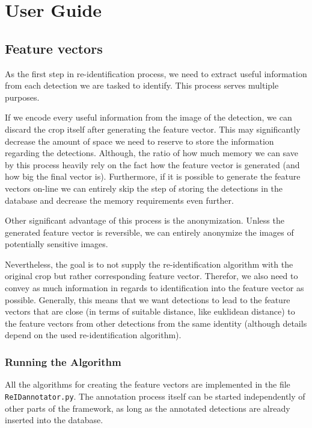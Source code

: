 \chapter{User Guide}

\label{ch:guide}

\section{Feature vectors}

As the first step in re-identification process, we need to extract useful information
from each detection we are tasked to identify. This process serves multiple purposes.

If we encode every useful information from the image of the detection, we can discard
the crop itself after generating the feature vector. This may significantly decrease
the amount of space we need to reserve to store the information regarding the detections.
Although, the ratio of how much memory we can save by this process heavily rely on
the fact how the feature vector is generated (and how big the final vector is).
Furthermore, if it is possible to generate the feature vectors on-line we can entirely
skip the step of storing the detections in the database and decrease the memory
requirements even further.

Other significant advantage of this process is the anonymization. Unless the generated
feature vector is reversible, we can entirely anonymize the images of potentially
sensitive images.

Nevertheless, the goal is to not supply the re-identification algorithm with the original
crop but rather corresponding feature vector. Therefor, we also need to convey
as much information in regards to identification into the feature vector as possible.
Generally, this means that we want detections to lead to the feature vectors that are
close (in terms of suitable distance, like euklidean distance) to the feature vectors
from other detections from the same identity (although details depend on the 
used re-identification algorithm).

\subsection{Running the Algorithm}
\label{sec:running_annotator}

All the algorithms for creating the feature vectors are implemented in the file
\texttt{ReID\/annotator.py}. The annotation process itself can be started independently
of other parts of the framework, as long as the annotated detections are already
inserted into the database.


